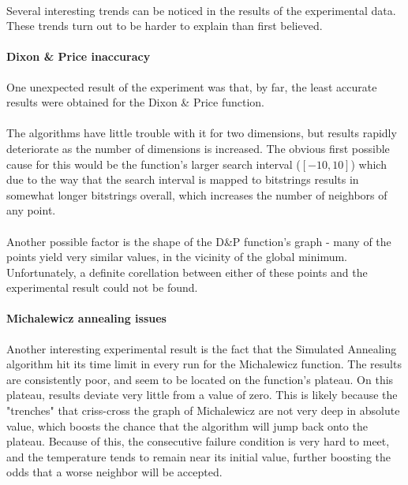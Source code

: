 \documentclass{article}
\begin{document}
    \paragraph{}
    Several interesting trends can be noticed in the results of the experimental data. These trends turn out to be harder to explain than first believed.
	\paragraph{Dixon \& Price inaccuracy}
    One unexpected result of the experiment was that, by far, the least accurate results were obtained for the Dixon \& Price function. 
    \paragraph{}
    The algorithms have little trouble with it for two dimensions, but results rapidly deteriorate as the number of dimensions is increased. The obvious first possible cause for this would be the function's larger search interval (\([-10, 10]\)) which due to the way that the search interval is mapped to bitstrings results in somewhat longer bitstrings overall, which increases the number of neighbors of any point.
    \paragraph{}
    Another possible factor is the shape of the D\&P function's graph - many of the points yield very similar values, in the vicinity of the global minimum. Unfortunately, a definite corellation between either of these points and the experimental result could not be found.

    \paragraph{Michalewicz annealing issues}
    Another interesting experimental result is the fact that the Simulated Annealing algorithm hit its time limit in every run for the Michalewicz function. The results are consistently poor, and seem to be located on the function's plateau. On this plateau, results deviate very little from a value of zero. This is likely because the "trenches" that criss-cross the graph of Michalewicz are not very deep in absolute value, which boosts the chance that the algorithm will jump back onto the plateau. Because of this, the consecutive failure condition is very hard to meet, and the temperature tends to remain near its initial value, further boosting the odds that a worse neighbor will be accepted.
\end{document}
